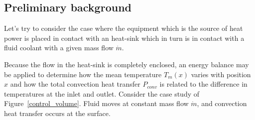 \documentclass[11pt,a4paper,oneside]{book}
\numberwithin{equation}{section}
\theoremstyle{it}
\theoremstyle{definition}
\begin{document}
\subsection{Preliminary background}
Let's try to consider the case where the equipment which is the source of heat power is placed in contact with an heat-sink which in turn is in contact with a fluid coolant with a given mass flow $\dot{m}$.

Because the flow in the heat-sink is completely enclosed, an energy balance may be applied to determine how the mean temperature $T_m(x)$ varies with position $x$ and how the total convection heat transfer $P_{conv}$ is related to the difference in temperatures at the inlet and outlet. Consider the case study of Figure~\ref{control_volume}. Fluid moves at constant mass flow $\dot{m}$, and convection heat transfer occurs at the surface. 
\end{document}
